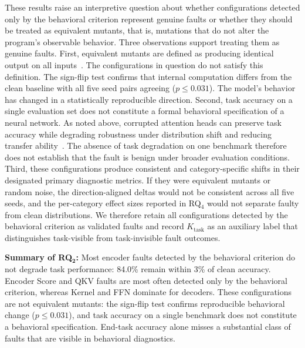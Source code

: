 These results raise an interpretive question about whether configurations detected only by the behavioral criterion represent genuine faults or whether they should be treated as equivalent mutants, that is, mutations that do not alter the program's observable behavior. Three observations support treating them as genuine faults. First, equivalent mutants are defined as producing identical output on all inputs~\cite{deepcrime,deepmutation}. The configurations in question do not satisfy this definition. The sign-flip test confirms that internal computation differs from the clean baseline with all five seed pairs agreeing ($p \leq 0.031$). The model's behavior has changed in a statistically reproducible direction. Second, task accuracy on a single evaluation set does not constitute a formal behavioral specification of a neural network. As noted above, corrupted attention heads can preserve task accuracy while degrading robustness under distribution shift and reducing transfer ability~\cite{michel2019sixteen,voita2019analyzing}. The absence of task degradation on one benchmark therefore does not establish that the fault is benign under broader evaluation conditions. Third, these configurations produce consistent and category-specific shifts in their designated primary diagnostic metrics. If they were equivalent mutants or random noise, the direction-aligned deltas would not be consistent across all five seeds, and the per-category effect sizes reported in RQ$_4$ would not separate faulty from clean distributions. We therefore retain all configurations detected by the behavioral criterion as validated faults and record $K_{\text{task}}$ as an auxiliary label that distinguishes task-visible from task-invisible fault outcomes.


\begin{rqsummary}
\textbf{Summary of RQ$\mathbf{_2}$:} Most encoder faults detected by the behavioral criterion do not degrade task performance: 84.0\% remain within 3\% of clean accuracy. Encoder Score and QKV faults are most often detected only by the behavioral criterion, whereas Kernel and FFN dominate for decoders. These configurations are not equivalent mutants: the sign-flip test confirms reproducible behavioral change ($p \leq 0.031$), and task accuracy on a single benchmark does not constitute a behavioral specification. End-task accuracy alone misses a substantial class of faults that are visible in behavioral diagnostics.
\end{rqsummary}

